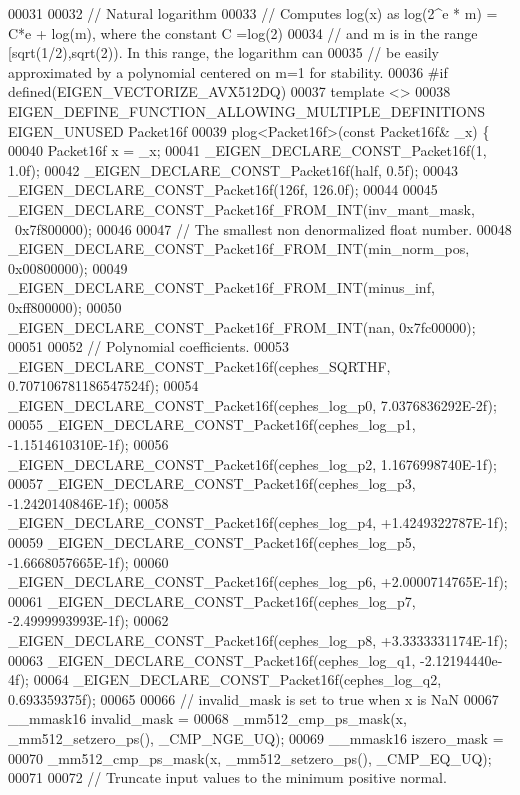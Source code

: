 \begin{DoxyCode}
00031 
00032 \textcolor{comment}{// Natural logarithm}
00033 \textcolor{comment}{// Computes log(x) as log(2^e * m) = C*e + log(m), where the constant C =log(2)}
00034 \textcolor{comment}{// and m is in the range [sqrt(1/2),sqrt(2)). In this range, the logarithm can}
00035 \textcolor{comment}{// be easily approximated by a polynomial centered on m=1 for stability.}
00036 \textcolor{preprocessor}{#if defined(EIGEN\_VECTORIZE\_AVX512DQ)}
00037 \textcolor{keyword}{template} <>
00038 EIGEN\_DEFINE\_FUNCTION\_ALLOWING\_MULTIPLE\_DEFINITIONS EIGEN\_UNUSED Packet16f
00039 plog<Packet16f>(\textcolor{keyword}{const} Packet16f& \_x) \{
00040   Packet16f x = \_x;
00041   \_EIGEN\_DECLARE\_CONST\_Packet16f(1, 1.0f);
00042   \_EIGEN\_DECLARE\_CONST\_Packet16f(half, 0.5f);
00043   \_EIGEN\_DECLARE\_CONST\_Packet16f(126f, 126.0f);
00044 
00045   \_EIGEN\_DECLARE\_CONST\_Packet16f\_FROM\_INT(inv\_mant\_mask, ~0x7f800000);
00046 
00047   \textcolor{comment}{// The smallest non denormalized float number.}
00048   \_EIGEN\_DECLARE\_CONST\_Packet16f\_FROM\_INT(min\_norm\_pos, 0x00800000);
00049   \_EIGEN\_DECLARE\_CONST\_Packet16f\_FROM\_INT(minus\_inf, 0xff800000);
00050   \_EIGEN\_DECLARE\_CONST\_Packet16f\_FROM\_INT(nan, 0x7fc00000);
00051 
00052   \textcolor{comment}{// Polynomial coefficients.}
00053   \_EIGEN\_DECLARE\_CONST\_Packet16f(cephes\_SQRTHF, 0.707106781186547524f);
00054   \_EIGEN\_DECLARE\_CONST\_Packet16f(cephes\_log\_p0, 7.0376836292E-2f);
00055   \_EIGEN\_DECLARE\_CONST\_Packet16f(cephes\_log\_p1, -1.1514610310E-1f);
00056   \_EIGEN\_DECLARE\_CONST\_Packet16f(cephes\_log\_p2, 1.1676998740E-1f);
00057   \_EIGEN\_DECLARE\_CONST\_Packet16f(cephes\_log\_p3, -1.2420140846E-1f);
00058   \_EIGEN\_DECLARE\_CONST\_Packet16f(cephes\_log\_p4, +1.4249322787E-1f);
00059   \_EIGEN\_DECLARE\_CONST\_Packet16f(cephes\_log\_p5, -1.6668057665E-1f);
00060   \_EIGEN\_DECLARE\_CONST\_Packet16f(cephes\_log\_p6, +2.0000714765E-1f);
00061   \_EIGEN\_DECLARE\_CONST\_Packet16f(cephes\_log\_p7, -2.4999993993E-1f);
00062   \_EIGEN\_DECLARE\_CONST\_Packet16f(cephes\_log\_p8, +3.3333331174E-1f);
00063   \_EIGEN\_DECLARE\_CONST\_Packet16f(cephes\_log\_q1, -2.12194440e-4f);
00064   \_EIGEN\_DECLARE\_CONST\_Packet16f(cephes\_log\_q2, 0.693359375f);
00065 
00066   \textcolor{comment}{// invalid\_mask is set to true when x is NaN}
00067   \_\_mmask16 invalid\_mask =
00068       \_mm512\_cmp\_ps\_mask(x, \_mm512\_setzero\_ps(), \_CMP\_NGE\_UQ);
00069   \_\_mmask16 iszero\_mask =
00070       \_mm512\_cmp\_ps\_mask(x, \_mm512\_setzero\_ps(), \_CMP\_EQ\_UQ);
00071 
00072   \textcolor{comment}{// Truncate input values to the minimum positive normal.}

\end{DoxyCode}
